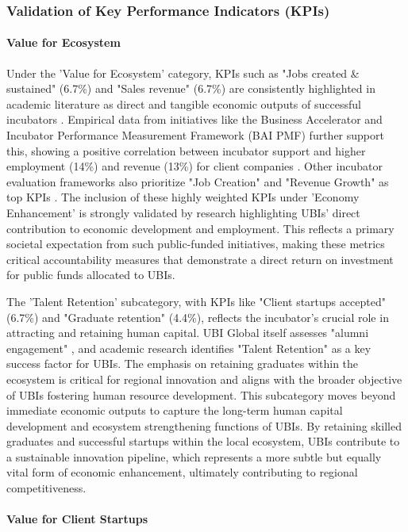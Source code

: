 \documentclass[../Main.tex]{subfiles}
\begin{document}
\subsubsection{Validation of Key Performance Indicators (KPIs)}
\paragraph{Value for Ecosystem}
Under the 'Value for Ecosystem' category, KPIs such as "Jobs created \& sustained" (6.7\%) and "Sales revenue" (6.7\%) are consistently highlighted in academic literature as direct and tangible economic outputs of successful incubators \cite{UBI_KeyFactors}. Empirical data from initiatives like the Business Accelerator and Incubator Performance Measurement Framework (BAI PMF) further support this, showing a positive correlation between incubator support and higher employment (14\%) and revenue (13\%) for client companies \cite{FSU_BusIncubator}. Other incubator evaluation frameworks also prioritize "Job Creation" and "Revenue Growth" as top KPIs \cite{Jedhe_Viability}. The inclusion of these highly weighted KPIs under 'Economy Enhancement' is strongly validated by research highlighting UBIs' direct contribution to economic development and employment. This reflects a primary societal expectation from such public-funded initiatives, making these metrics critical accountability measures that demonstrate a direct return on investment for public funds allocated to UBIs.

The 'Talent Retention' subcategory, with KPIs like "Client startups accepted" (6.7\%) and "Graduate retention" (4.4\%), reflects the incubator's crucial role in attracting and retaining human capital. UBI Global itself assesses "alumni engagement" , and academic research identifies "Talent Retention" as a key success factor for UBIs. The emphasis on retaining graduates within the ecosystem is critical for regional innovation and aligns with the broader objective of UBIs fostering human resource development. This subcategory moves beyond immediate economic outputs to capture the long-term human capital development and ecosystem strengthening functions of UBIs. By retaining skilled graduates and successful startups within the local ecosystem, UBIs contribute to a sustainable innovation pipeline, which represents a more subtle but equally vital form of economic enhancement, ultimately contributing to regional competitiveness.

\paragraph{Value for Client Startups}
\end{document}
